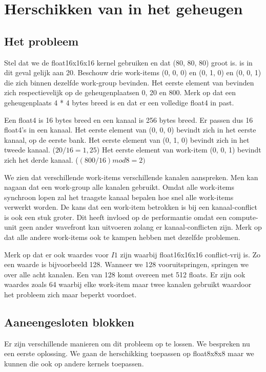 
\section{Herschikken van \TT{} in het geheugen}
\subsection{Het probleem}
Stel dat we de float16x16x16 kernel gebruiken en dat \TT{} (80, 80, 80) groot is.  is in dit geval gelijk aan 20. Beschouw drie work-items (0, 0, 0) en (0, 1, 0) en (0, 0, 1) die zich binnen dezelfde work-group bevinden. Het eerste element van \TT{} bevinden zich respectievelijk op de geheugenplaatsen 0, 20 en 800. Merk op dat een geheugenplaats 4 * 4 bytes breed is en dat er een volledige float4 in past.

Een float4 is 16 bytes breed en een kanaal is 256 bytes breed. Er passen dus 16 float4's in een kanaal. Het eerste element van (0, 0, 0) bevindt zich in het eerste kanaal, op de eerste bank. Het eerste element van (0, 1, 0) bevindt zich in het tweede kanaal. ($20 / 16 = 1,25$) Het eerste element van work-item (0, 0, 1) bevindt zich het derde kanaal. ($(800 / 16) mod 8 = 2)$

We zien dat verschillende work-items verschillende kanalen aanspreken. Men kan nagaan dat een work-group alle kanalen gebruikt. Omdat alle work-items synchroon lopen zal het traagste kanaal bepalen hoe snel alle work-items verwerkt worden. De kans dat een work-item betrokken is bij een kanaal-conflict is ook een stuk groter. Dit heeft invloed op de performantie omdat een compute-unit geen ander wavefront kan uitvoeren zolang er kanaal-conflicten zijn. Merk op dat alle andere work-items ook te kampen hebben met dezelfde problemen.

Merk op dat er ook waardes voor $I1$ zijn waarbij float16x16x16 conflict-vrij is. Zo een waarde is bijvoorbeeld 128. Wanneer we 128 vooruitspringen, springen we over alle acht kanalen. Een  van 128 komt overeen met 512 floats. Er zijn ook waardes zoals 64 waarbij elke work-item maar twee kanalen gebruikt waardoor het probleem zich maar beperkt voordoet.

\subsection{Aaneengesloten blokken}
Er zijn verschillende manieren om dit probleem op te lossen. We bespreken nu een eerste oplossing. We gaan de herschikking toepassen op float8x8x8 maar we kunnen die ook op andere kernels toepassen.

